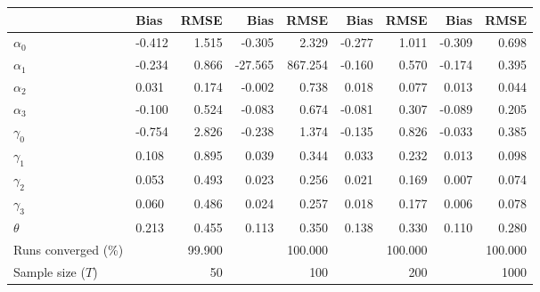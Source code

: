 
\begin{tabular}[t]{llrrrrrrr}
\toprule
  & Bias & RMSE & Bias & RMSE & Bias & RMSE & Bias & RMSE\\
\midrule
$\alpha_{0}$ & -0.412 & 1.515 & -0.305 & 2.329 & -0.277 & 1.011 & -0.309 & 0.698\\
$\alpha_{1}$ & -0.234 & 0.866 & -27.565 & 867.254 & -0.160 & 0.570 & -0.174 & 0.395\\
$\alpha_{2}$ & 0.031 & 0.174 & -0.002 & 0.738 & 0.018 & 0.077 & 0.013 & 0.044\\
$\alpha_{3}$ & -0.100 & 0.524 & -0.083 & 0.674 & -0.081 & 0.307 & -0.089 & 0.205\\
$\gamma_{0}$ & -0.754 & 2.826 & -0.238 & 1.374 & -0.135 & 0.826 & -0.033 & 0.385\\
$\gamma_{1}$ & 0.108 & 0.895 & 0.039 & 0.344 & 0.033 & 0.232 & 0.013 & 0.098\\
$\gamma_{2}$ & 0.053 & 0.493 & 0.023 & 0.256 & 0.021 & 0.169 & 0.007 & 0.074\\
$\gamma_{3}$ & 0.060 & 0.486 & 0.024 & 0.257 & 0.018 & 0.177 & 0.006 & 0.078\\
$\theta$ & 0.213 & 0.455 & 0.113 & 0.350 & 0.138 & 0.330 & 0.110 & 0.280\\
Runs converged (\%) &  & 99.900 &  & 100.000 &  & 100.000 &  & 100.000\\
Sample size ($T$) &  & 50 &  & 100 &  & 200 &  & 1000\\
\bottomrule
\end{tabular}
